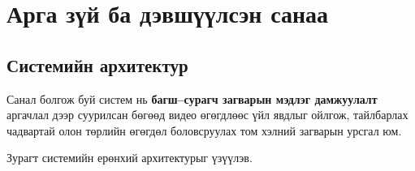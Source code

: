 
\chapter{Арга зүй ба дэвшүүлсэн санаа}

\section{Системийн архитектур}

Санал болгож буй систем нь \textbf{багш--сурагч загварын мэдлэг дамжуулалт} аргачлал дээр суурилсан бөгөөд видео өгөгдлөөс үйл явдлыг ойлгож, тайлбарлах чадвартай олон төрлийн өгөгдөл боловсруулах том хэлний загварын урсгал юм.

Зурагт системийн ерөнхий архитектурыг үзүүлэв.

